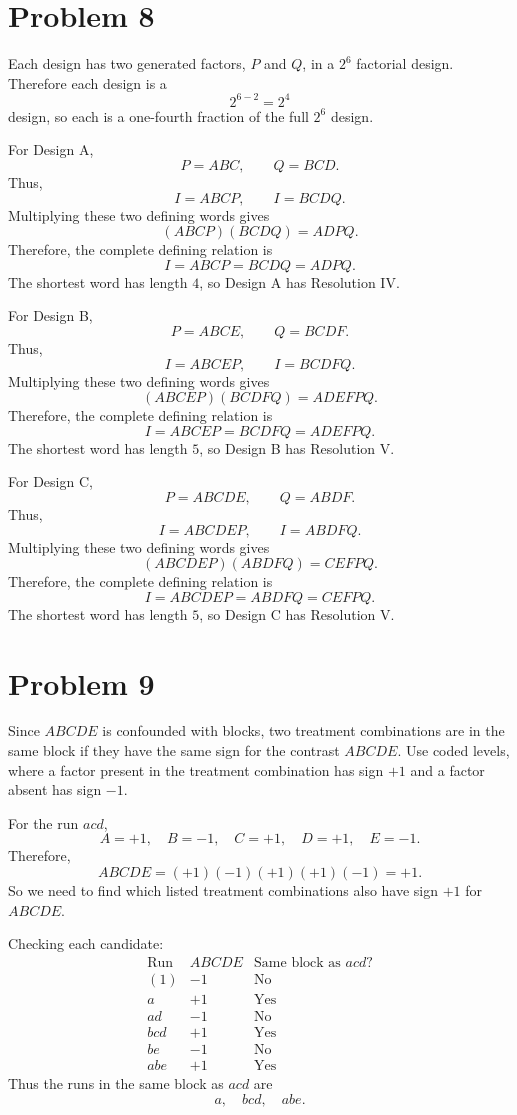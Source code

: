 \documentclass[answers,12pt,addpoints]{exam}
\begin{document}
\section{Problem 8}

\begin{solution}
Each design has two generated factors, $P$ and $Q$, in a $2^6$ factorial design. Therefore each design is a
\[
2^{6-2}=2^4
\]
design, so each is a one-fourth fraction of the full $2^6$ design.

For Design A,
\[
P=ABC,\qquad Q=BCD.
\]
Thus,
\[
I=ABCP,\qquad I=BCDQ.
\]
Multiplying these two defining words gives
\[
(ABCP)(BCDQ)=ADPQ.
\]
Therefore, the complete defining relation is
\[
I=ABCP=BCDQ=ADPQ.
\]
The shortest word has length $4$, so Design A has Resolution IV.

For Design B,
\[
P=ABCE,\qquad Q=BCDF.
\]
Thus,
\[
I=ABCEP,\qquad I=BCDFQ.
\]
Multiplying these two defining words gives
\[
(ABCEP)(BCDFQ)=ADEFPQ.
\]
Therefore, the complete defining relation is
\[
I=ABCEP=BCDFQ=ADEFPQ.
\]
The shortest word has length $5$, so Design B has Resolution V.

For Design C,
\[
P=ABCDE,\qquad Q=ABDF.
\]
Thus,
\[
I=ABCDEP,\qquad I=ABDFQ.
\]
Multiplying these two defining words gives
\[
(ABCDEP)(ABDFQ)=CEFPQ.
\]
Therefore, the complete defining relation is
\[
I=ABCDEP=ABDFQ=CEFPQ.
\]
The shortest word has length $5$, so Design C has Resolution V.
\end{solution}

\section{Problem 9}

\begin{solution}
Since $ABCDE$ is confounded with blocks, two treatment combinations are in the same block if they have the same sign for the contrast $ABCDE$. Use coded levels, where a factor present in the treatment combination has sign $+1$ and a factor absent has sign $-1$.

For the run $acd$,
\[
A=+1,\quad B=-1,\quad C=+1,\quad D=+1,\quad E=-1.
\]
Therefore,
\[
ABCDE=(+1)(-1)(+1)(+1)(-1)=+1.
\]
So we need to find which listed treatment combinations also have sign $+1$ for $ABCDE$.

Checking each candidate:
\[
\begin{array}{c|c|c}
\text{Run} & ABCDE & \text{Same block as } acd? \\
\hline
(1) & -1 & \text{No} \\
a & +1 & \text{Yes} \\
ad & -1 & \text{No} \\
bcd & +1 & \text{Yes} \\
be & -1 & \text{No} \\
abe & +1 & \text{Yes}
\end{array}
\]
Thus the runs in the same block as $acd$ are
\[
a,\quad bcd,\quad abe.
\]
\end{solution}
\end{document}
